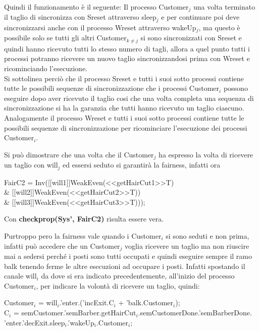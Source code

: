 Quindi il funzionamento è il seguente:
Il processo \textsf{Customer$_{j}$} una volta terminato il taglio di sincronizza con \textsf{Sreset} attraverso \textsf{sleep$_{j}$} e per continuare poi deve sincronizzarsi anche con il processo \textsf{Wreset} attraverso \textsf{wakeUp$_{j}$}, ma questo è possibile solo se tutti gli altri \textsf{Customer$_{k\not=j}$} si sono sincronizzati con \textsf{Sreset} e quindi hanno ricevuto tutti lo stesso numero di tagli, allora a quel punto tutti i processi potranno ricevere un nuovo taglio sincronizzandosi prima con \textsf{Wreset} e ricominciando l'esecuzione.\\
Si sottolinea perciò che il processo \textsf{Sreset} e tutti i suoi sotto processi contiene tutte le possibili sequenze di sincronizzazione che i processi \textsf{Customer$_{i}$} possono eseguire dopo aver ricevuto il taglio cosi che una volta completa una sequenza di sincronizzazione si ha la garanzia che tutti hanno ricevuto un taglio ciascuno. Analogamente il processo \textsf{Wreset} e tutti i suoi sotto processi contiene tutte le possibili sequenze di sincronizzazione per ricominciare l'esecuzione dei processi \textsf{Customer$_{i}$}.

Si può dimostrare che una volta che il \textsf{Customer$_{j}$} ha espresso la volta di ricevere un taglio con \textsf{will$_{j}$} ed essersi seduto si garantirà la fairness, infatti ora

\begin{center}
	\textsf{FairC2 = Inv([[will1]]WeakEven(<<getHairCut1>>T) \\\& [[will2]]WeakEven(<<getHairCut2>>T)) \\\& [[will3]]WeakEven(<<getHairCut3>>T)));}
\end{center}

Con \textbf{checkprop(Sys', FairC2)} risulta essere vera.

Purtroppo pero la fairness vale quando i \textsf{Customer$_{i}$} si sono seduti e non prima, infatti può accedere che un \textsf{Customer$_{j}$} voglia ricevere un taglio ma non riuscire mai a sedersi perché i posti sono tutti occupati e quindi eseguire sempre il ramo \textsf{balk} tenendo ferme le altre esecuzioni ad occupare i posti. Infatti spostando il canale \textsf{will$_{i}$} da dove si era indicato precedentemente, all'inizio del processo \textsf{Customer$_{i}$}, per indicare la volontà di ricevere un taglio, quindi: 

\textsf{Customer$_{i}$ = will$_{i}$.'enter.('incExit.C$_{i}$ + 'balk.Customer$_{i}$);}\\
\textsf{C$_{i}$ = semCustomer.'semBarber.getHairCut$_{i}$.semCustomerDone.'semBarberDone.\\'enter.'decExit.sleep$_{i}$.'wakeUp$_{i}$.Customer$_{i}$;}

